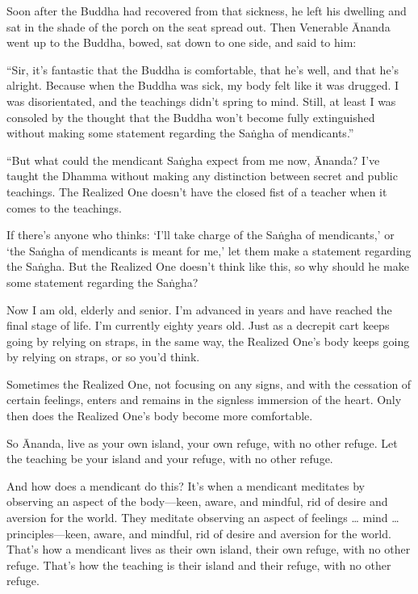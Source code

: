 \documentclass[12pt,openany]{book}%
\begin{document}
Soon after the Buddha had recovered from that sickness, he left his dwelling and sat in the shade of the porch on the seat spread out. Then Venerable Ānanda went up to the Buddha, bowed, sat down to one side, and said to him: 

“Sir, it’s fantastic that the Buddha is comfortable, that he’s well, and that he’s alright. Because when the Buddha was sick, my body felt like it was drugged. I was disorientated, and the teachings didn’t spring to mind. Still, at least I was consoled by the thought that the Buddha won’t become fully extinguished without making some statement regarding the \textsanskrit{Saṅgha} of mendicants.” 

“But what could the mendicant \textsanskrit{Saṅgha} expect from me now, Ānanda? I’ve taught the Dhamma without making any distinction between secret and public teachings. The Realized One doesn’t have the closed fist of a teacher when it comes to the teachings. 

If there’s anyone who thinks: ‘I’ll take charge of the \textsanskrit{Saṅgha} of mendicants,’ or ‘the \textsanskrit{Saṅgha} of mendicants is meant for me,’ let them make a statement regarding the \textsanskrit{Saṅgha}. But the Realized One doesn’t think like this, so why should he make some statement regarding the \textsanskrit{Saṅgha}? 

Now I am old, elderly and senior. I’m advanced in years and have reached the final stage of life. I’m currently eighty years old. Just as a decrepit cart keeps going by relying on straps, in the same way, the Realized One’s body keeps going by relying on straps, or so you’d think. 

Sometimes the Realized One, not focusing on any signs, and with the cessation of certain feelings, enters and remains in the signless immersion of the heart. Only then does the Realized One’s body become more comfortable. 

So Ānanda, live as your own island, your own refuge, with no other refuge. Let the teaching be your island and your refuge, with no other refuge. 

And how does a mendicant do this? It’s when a mendicant meditates by observing an aspect of the body—keen, aware, and mindful, rid of desire and aversion for the world. They meditate observing an aspect of feelings … mind … principles—keen, aware, and mindful, rid of desire and aversion for the world. That’s how a mendicant lives as their own island, their own refuge, with no other refuge. That’s how the teaching is their island and their refuge, with no other refuge. 
\end{document}
